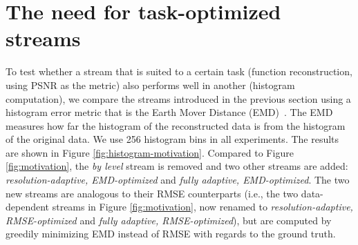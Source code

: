 \section{The need for task-optimized streams}

To test whether a stream that is suited to a certain task (function reconstruction, using PSNR as
the metric) also performs well in another (histogram computation), we compare the streams introduced
in the previous section using a histogram error metric that is the Earth Mover Distance (EMD)~\cite{emd1998}.
The EMD measures how far the histogram of the reconstructed data is from the histogram of
the original data. We use 256 histogram bins in all experiments. The results are shown in Figure
\ref{fig:histogram-motivation}. Compared to Figure \ref{fig:motivation}, the \emph{by level} stream
is removed and two other streams are added: \emph{resolution-adaptive, EMD-optimized} and
\emph{fully adaptive, EMD-optimized}. The two new streams are analogous to their RMSE counterparts
(i.e., the two data-dependent streams in Figure \ref{fig:motivation}, now renamed to
\emph{resolution-adaptive, RMSE-optimized} and \emph{fully adaptive, RMSE-optimized}), but are
computed by greedily minimizing EMD instead of RMSE with regards to the ground truth.

